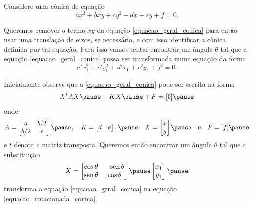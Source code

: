 \documentclass{beamer}
\begin{document}
\begin{frame}
    Considere uma cônica de equação
    \begin{equation}\label{equacao_geral_conica}
        ax^2 + bxy + cy^2 + dx + ey + f = 0.
    \end{equation}\pause

    Queremos remover o termo $xy$ \pause da equação \eqref{equacao_geral_conica} \pause para então usar uma translação de eixos, \pause se necessário, \pause e
    com isso identificar a cônica definida por tal equação. \pause Para isso vamos tentar encontrar um ângulo $\theta$ \pause tal que a equação
    \eqref{equacao_geral_conica} \pause possa ser transformada numa equação da forma
    \begin{equation}\label{equacao_rotacionada_conica}
        a'x_1^2 + c'y_1^2 + d'x_1 + e'y_1 + f' = 0.
    \end{equation}
\end{frame}

\begin{frame}
    Inicialmente observe que a \eqref{equacao_geral_conica} \pause pode ser escrita na forma\pause
    \begin{equation*}\label{equacao_matricial_conica}
        X^tAX \pause + KX \pause + F = [0]\pause
    \end{equation*}
    onde\pause
    \[
        A = \begin{bmatrix}
            a   & b/2 \\
            b/2 & c
        \end{bmatrix}\pause
        , \quad K = \begin{bmatrix}
            d & e
        \end{bmatrix}, \pause \quad X = \begin{bmatrix}
            x \\
            y
        \end{bmatrix}\pause \quad\mbox{e}\quad F = [f]\pause
    \]
    e $t$ denota a matriz transposta. \pause Queremos então encontrar um ângulo $\theta$ \pause tal que a substituição\pause
    \begin{equation*}
        X = \begin{bmatrix}
            \cos\theta & -\sin\theta \\
            \sin\theta & \cos\theta
        \end{bmatrix}\pause \begin{bmatrix}
            x_1 \\y_1
        \end{bmatrix}\pause
    \end{equation*}
    transforma a equação \eqref{equacao_geral_conica} \pause na equação \eqref{equacao_rotacionada_conica}.
\end{frame}
\end{document}
